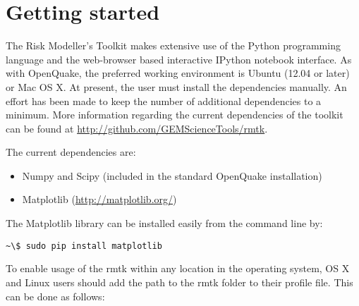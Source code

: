 \section{Getting started}
The Risk Modeller's Toolkit makes extensive use of the Python programming language and the web-browser based interactive IPython notebook interface. As with OpenQuake, the preferred working environment is Ubuntu (12.04 or later) or Mac OS X. At present, the user  must install the dependencies manually. An effort has been made to keep the number of additional dependencies to a minimum. More information regarding the current dependencies of the toolkit can be found at \href{http://github.com/GEMScienceTools/rmtk}{http://github.com/GEMScienceTools/rmtk}.

The current dependencies are:
\begin{itemize}
\item Numpy and Scipy (included in the standard OpenQuake installation)
\item Matplotlib (\href{http://matplotlib.org/}{http://matplotlib.org/})
\end{itemize}

The Matplotlib library can be installed easily from the command line by:

\begin{Verbatim}[frame=single, commandchars=\\\{\}, fontsize=\scriptsize]
~\$ sudo pip install matplotlib
\end{Verbatim}

To enable usage of the rmtk within any location in the operating system, OS X and Linux users should add the path to the rmtk folder to their profile file. This can be done as follows:

